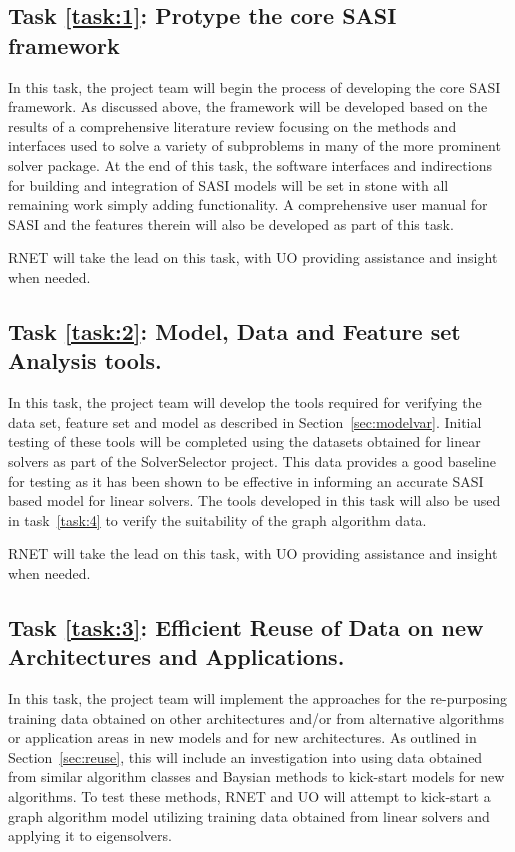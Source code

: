 \setcounter{taskCount}{0}

\label{task:1}
\subsection{Task \ref{task:1}: Protype the core SASI framework}
In this task, the project team will begin the process of developing the core SASI framework. As discussed above, the framework
will be developed based on the results of a comprehensive literature review focusing on the methods 
and interfaces used to solve a variety of subproblems in many of the more prominent solver package.
At the end of this task, the software interfaces and indirections for building and integration of SASI models 
will be set in stone with all remaining work simply adding functionality. A comprehensive user manual for SASI and
the features therein will also be developed as part of this task. 

RNET will take the lead on this task, with UO providing assistance and insight when needed. 

\label{task:2}
\subsection{Task \ref{task:2}: Model, Data and Feature set Analysis tools. }
In this task, the project team will develop the tools required for verifying the data set, feature set and model as described in Section~\ref{sec:modelvar}. Initial testing of these tools will be completed using the datasets obtained for linear solvers as part of the SolverSelector 
project. This data provides a good baseline for testing as it has been shown to be effective in informing an accurate SASI based model for linear solvers. The tools developed in this task will also be used in task~\ref{task:4} to verify the suitability of the graph algorithm data. 

RNET will take the lead on this task, with UO providing assistance and insight when needed. 


\label{task:3}
\subsection{Task \ref{task:3}: Efficient Reuse of Data on new Architectures and Applications.}
In this task, the project team will implement the approaches for the re-purposing training data obtained on other architectures and/or from alternative algorithms or application areas in new models and for new architectures. As outlined in Section~\ref{sec:reuse}, this will include an investigation into using data obtained from similar algorithm classes and Baysian methods to kick-start models for new algorithms. To test these methods, RNET and UO will attempt to kick-start a graph algorithm model utilizing training data obtained from linear solvers and applying it to eigensolvers. 

